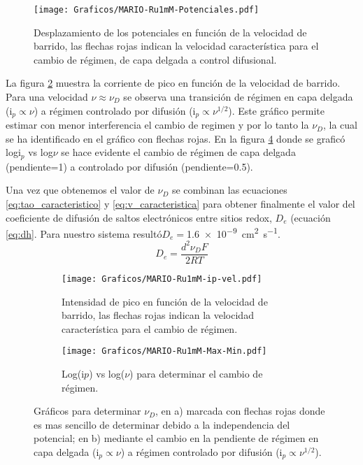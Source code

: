 			 \begin{figure}[ht]
					\centering
			 	    \texttt{[image: Graficos/MARIO-Ru1mM-Potenciales.pdf]}
			        \caption[Desplazamiento de potenciales]{Desplazamiento de los potenciales en función de la velocidad de barrido, las flechas rojas indican la velocidad característica para el cambio de régimen, de capa delgada a control difusional.}
			        \label{fig:corrimiento-potenciales}
			      	\end{figure}
         La figura \ref{fig:ip-vel} muestra la corriente de pico en función de la velocidad de barrido. Para una velocidad $\nu \approx \nu_{\scriptscriptstyle{D}}$ se observa una transición de régimen en capa delgada ($\text{i}_{p} \propto \nu$) a régimen controlado por difusión ($\text{i}_{p} \propto \nu^{1/2}$).	Este gráfico permite estimar con menor interferencia el cambio de regimen y por lo tanto la $\nu_{\scriptscriptstyle{D}}$, la cual se ha identificado en el gráfico con flechas rojas. En la figura \ref{fig:ip-vel2} donde se graficó log{i$_p$} vs log{$\nu$} se hace evidente el cambio de régimen de capa delgada (pendiente=1) a controlado por difusión (pendiente=0.5).

		 Una vez que obtenemos el valor de  $\nu_{\scriptscriptstyle{D}}$ se combinan las ecuaciones \ref{eq:tao_caracteristico} y \ref{eq:v_caracteristica} para obtener finalmente el valor del coeficiente de difusión de saltos electrónicos entre sitios redox,  $D_e$ (ecuación \ref{eq:dh}. Para nuestro sistema resultó\hfill\linebreak$D_e=$\SI{1.6e-9}{\square\cm\per\second}.  
			\begin{equation}
					D_e= \frac{d^2\nu_{\scriptscriptstyle{D}}F}{2RT}
					\label{eq:dh}
			\end{equation}
            \begin{figure}[ht]
			  \begin{subfigure}[t]{0.495\textwidth}
			  \texttt{[image: Graficos/MARIO-Ru1mM-ip-vel.pdf]}
			  \caption{Intensidad de pico  en función de la velocidad de barrido, las flechas rojas indican la velocidad característica para el cambio de régimen.}
			  \label{fig:ip-vel}
		  	 \end{subfigure}	
			 \begin{subfigure}[t]{0.495\textwidth}
			  \texttt{[image: Graficos/MARIO-Ru1mM-Max-Min.pdf]}
			  \caption{Log(i$p$) vs log($\nu$) para determinar el cambio de régimen.}
			  \label{fig:logj-logv}
		  	 \end{subfigure}
			  \caption[Calculo de velocidad de barrido característica]{Gráficos para determinar $\nu_{\scriptscriptstyle{D}}$, en a) marcada con flechas rojas donde es mas sencillo de determinar debido a la independencia del potencial; en b) mediante el cambio en la pendiente de  régimen en capa delgada ($\text{i}_{p} \propto \nu$) a régimen controlado por difusión ($\text{i}_{p} \propto \nu^{1/2}$).}
			  \label{fig:ip-vel2}
			  \end{figure}
	 

